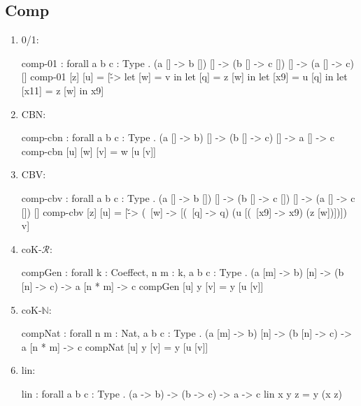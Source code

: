 \subsection{Comp}
\begin{enumerate}
\item 0/1: 
\begin{granule}
comp-01 : forall { a b c : Type }
        . (a [] -> b []) [] 
        -> (b [] -> c []) [] 
        -> (a [] -> c) []
comp-01 [z] [u] = 
    [\v -> 
        let [w] = v in 
        let [q] = z [w] in 
        let [x9] = u [q] in 
        let [x11] = z [w] in x9]
\end{granule}
\item CBN: 
\begin{granule}
comp-cbn : forall { a b c : Type }
         . (a [] -> b) [] 
         -> (b [] -> c) [] -> a [] -> c
comp-cbn [u] [w] [v] = w [u [v]]
\end{granule}
\item CBV: 
\begin{granule}
comp-cbv : forall { a b c : Type }  . 
         (a [] -> b []) [] 
         -> (b [] -> c []) [] 
         -> (a [] -> c []) []
comp-cbv [z] [u] = 
    [\v -> 
        (\ [w] -> 
            [(\ [q] -> q) (u [(\ [x9] -> x9) (z [w])])]) v]
\end{granule}
\item coK-$\mathcal{R}$:
\begin{granule}
compGen : forall {k : Coeffect, n m : k, a b c : Type} 
        . (a [m] -> b) [n] 
        -> (b [n] -> c) 
        -> a [n * m] 
        -> c
compGen [u] y [v] = y [u [v]]
\end{granule}
\item coK-$\mathbb{N}$:
\begin{granule}
compNat : forall {n m : Nat, a b c : Type} 
     . (a [m] -> b) [n] 
     -> (b [n] -> c) 
     -> a [n * m] 
     -> c
compNat [u] y [v] = y [u [v]]
\end{granule}
\item lin:
\begin{granule}
lin : forall { a b c : Type }
     . (a -> b) 
     -> (b -> c) 
     -> a 
     -> c
lin x y z = y (x z)
\end{granule}
\end{enumerate}



